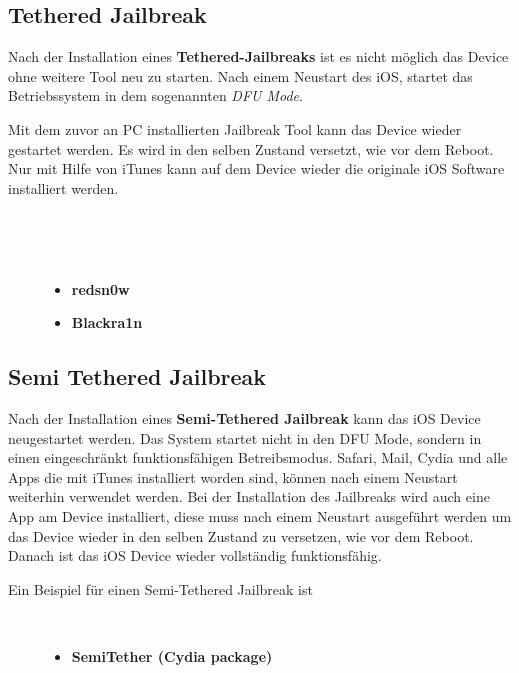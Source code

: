 \subsection{Tethered Jailbreak}
\label{sec:JBTethered}
Nach der Installation eines \textbf{Tethered-Jailbreaks} ist es nicht möglich das Device ohne weitere Tool neu zu starten. Nach einem Neustart des iOS, startet das Betriebssystem in dem sogenannten \textit{\glqq DFU Mode\grqq{}}. \par
Mit dem zuvor an PC installierten Jailbreak Tool kann das Device wieder gestartet werden. Es wird in den selben Zustand versetzt, wie vor dem Reboot. Nur mit Hilfe von iTunes kann auf dem Device wieder die originale iOS Software installiert werden. 
\begin{description}
     \item[\parbox{\textwidth} {Nachfolgend werden zwei häufig verwendet Tethered-Jailbreak Tools angeführt}]~\par
    \item[]~\par
	\begin{itemize}
            \item \textbf{redsn0w}
            \item \textbf{Blackra1n}
    \end{itemize}
\end{description} 

\subsection{Semi Tethered Jailbreak}
\label{sec:JBSemiTethered}

Nach der Installation eines \textbf{Semi-Tethered Jailbreak} kann das iOS Device neugestartet werden. Das System startet nicht in den DFU Mode, sondern in einen eingeschränkt funktionsfähigen Betreibsmodus. Safari, Mail, Cydia und alle Apps die mit iTunes installiert worden sind, können nach einem Neustart weiterhin verwendet werden. Bei der Installation des Jailbreaks wird auch eine App am Device installiert, diese muss nach einem Neustart ausgeführt werden um das Device wieder in den selben Zustand zu versetzen, wie vor dem Reboot. Danach ist das iOS Device wieder vollständig funktionsfähig.

\begin{description}
    \item[Ein Beispiel für einen Semi-Tethered Jailbreak ist]~\par
	\begin{itemize}
        \item \textbf{SemiTether (Cydia package)}
    \end{itemize}
\end{description} 

